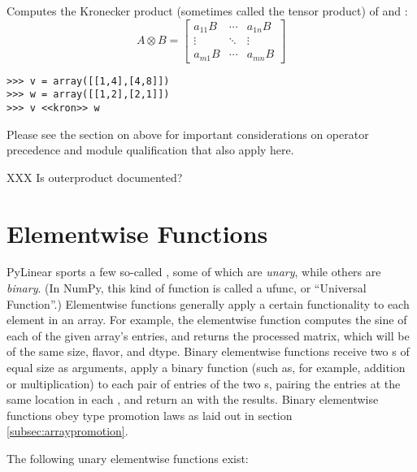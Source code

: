 \begin{itemize}
  Computes the Kronecker product 
  (sometimes called the tensor product) 
  of  and :
  \[%
    A \otimes B = 
    \begin{bmatrix} a_{11} B & \cdots & a_{1n}B \\ \vdots & 
    \ddots & \vdots \\ a_{m1} B & \cdots & a_{mn} B \end{bmatrix}
  \]

\begin{verbatim}
>>> v = array([[1,4],[4,8]])
>>> w = array([[1,2],[2,1]])
>>> v <<kron>> w
\end{verbatim}

  Please see the section on  above for important
  considerations on operator precedence and module qualification
  that also apply here.

\end{itemize}
XXX Is outerproduct documented?
\section{Elementwise Functions}
\label{subsec:elementwise-funcs}
PyLinear sports a few so-called ,
 some of which are
\emph{unary}, while others are \emph{binary}. (In NumPy, this kind of function
is called a ufunc, or ``Universal Function''.) Elementwise functions generally
apply a certain functionality to each element in an array. For example, the
 elementwise function computes the sine of each of the given
array's entries, and returns the processed matrix, which will be of the same
size, flavor, and dtype. Binary elementwise functions receive two
s of equal size as arguments, apply a binary function (such as,
for example, addition or multiplication) to each pair of entries of the two
s, pairing the entries at the same location in each ,
and return an  with the results. Binary elementwise functions obey
type promotion laws as laid out in section \ref{subsec:arraypromotion}.

The following unary elementwise functions exist:

